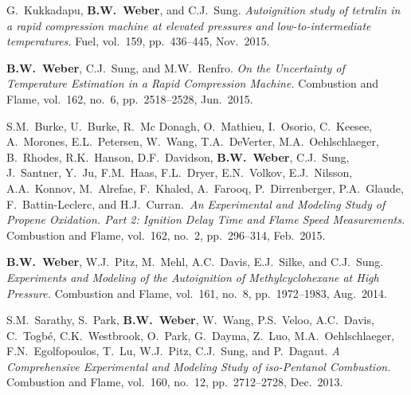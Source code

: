 \begin{bibmune}
\item G.\ Kukkadapu, \textbf{B.W.\ Weber}, and C.J.\ Sung.
      \textit{Autoignition study of tetralin in a rapid compression
      machine at elevated pressures and low-to-intermediate temperatures.}
      Fuel, vol.\ 159, pp.\ 436--445, Nov.\ 2015.\\

\item \textbf{B.W.\ Weber}, C.J.\ Sung, and M.W.\ Renfro. \textit{On
        the Uncertainty of Temperature Estimation in a Rapid
        Compression Machine.} Combustion and Flame, vol.\ 162,
        no.\ 6, pp.\ 2518--2528, Jun.\ 2015.

\item S.M.\ Burke, U.\ Burke, R.\ Mc Donagh, O.\ Mathieu, I.\ Osorio,
        C.\ Keesee, A.\ Morones, E.L.\ Petersen, W.\ Wang, T.A.\ DeVerter,
        M.A.\ Oehlschlaeger, B.\ Rhodes, R.K.\ Hanson, D.F.\ Davidson,
        \textbf{B.W.\ Weber}, C.J.\ Sung, J.\ Santner, Y.\ Ju, F.M.\ Haas,
        F.L.\ Dryer, E.N.\ Volkov, E.J.\ Nilsson, A.A.\ Konnov, M.\ Alrefae,
        F.\ Khaled, A.\ Farooq, P.\ Dirrenberger, P.A.\ Glaude,
        F.\ Battin-Leclerc, and H.J.\ Curran.\ \textit{An Experimental and
        Modeling Study of Propene Oxidation. Part 2: Ignition Delay Time
        and Flame Speed Measurements.} Combustion and Flame, vol.\ 162, no.\ 2,
        pp.\ 296--314, Feb.\ 2015. \\ 

\item \textbf{B.W.\ Weber}, W.J.\ Pitz, M.\ Mehl, A.C.\ Davis,
        E.J.\ Silke, and C.J.\ Sung. \textit{Experiments and
        Modeling of the Autoignition of Methylcyclohexane at High
        Pressure.} Combustion and Flame, vol.\ 161, no.\ 8, pp.\
        1972--1983, Aug.\ 2014.

\item S.M.\ Sarathy, S.\ Park, \textbf{B.W.\ Weber}, W.\ Wang,
        P.S.\ Veloo, A.C.\ Davis, C.\ Togbé, C.K.\ Westbrook, O.\ Park,
        G.\ Dayma, Z.\ Luo, M.A.\ Oehlschlaeger, F.N.\ Egolfopoulos,
        T.\ Lu, W.J.\ Pitz, C.J.\ Sung, and P.\ Dagaut. \textit{A
        Comprehensive Experimental and Modeling Study of iso-Pentanol
        Combustion.} Combustion and Flame, vol.\ 160, no.\ 12, pp.\
        2712--2728, Dec.\ 2013. 


\end{bibmune}
